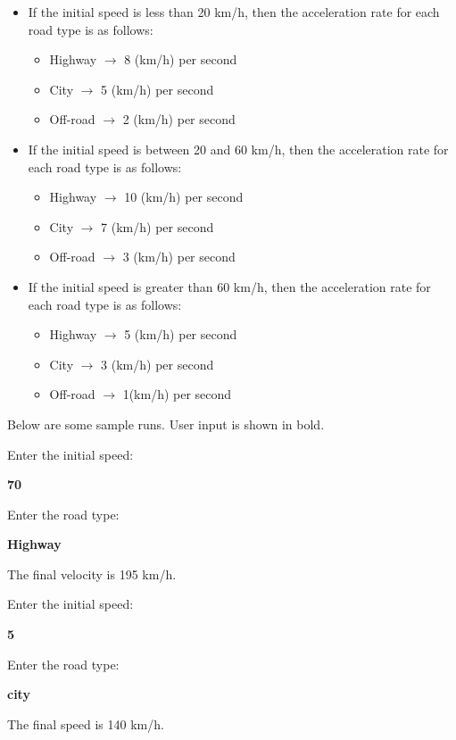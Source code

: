 \begin{itemize}
    \item If the initial speed is less than 20 km/h, then the acceleration rate for each road type is as follows:
    \begin{itemize}
        \item Highway $\rightarrow$ 8 (km/h) per second
        \item City $\rightarrow$ 5 (km/h) per second
        \item Off-road $\rightarrow$ 2 (km/h) per second
    \end{itemize}
   \item If the initial speed is between 20 and 60 km/h, then the acceleration rate for each road type is as follows:
   \begin{itemize}
        \item Highway $\rightarrow$ 10 (km/h) per second
        \item City $\rightarrow$ 7 (km/h) per second
        \item Off-road  $\rightarrow$ 3 (km/h) per second
   \end{itemize}
    \item If the initial speed is greater than 60 km/h, then the acceleration rate for each road type is as follows:
    \begin{itemize}
        \item Highway $\rightarrow$ 5 (km/h) per second
        \item City $\rightarrow$ 3 (km/h) per second
        \item Off-road $\rightarrow$ 1(km/h) per second 
    \end{itemize}
\end{itemize}

Below are some sample runs. User input is shown in bold. 

\begin{sample}
    Enter the initial speed:
    
    \textbf{70}
    
    Enter the road type:
    
    \textbf{Highway}
    
    The final velocity is 195 km/h.
\end{sample}

\begin{sample}
    Enter the initial speed:
    
    \textbf{5}
    
    Enter the road type:
    
    \textbf{city}
    
    The final speed is 140 km/h.
\end{sample}


